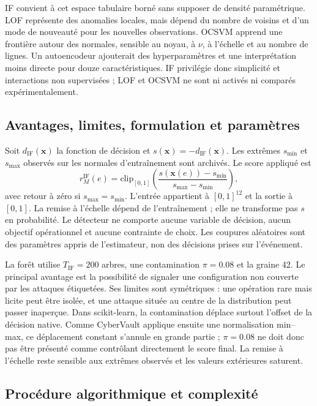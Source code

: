 \documentclass[11pt,a4paper,oneside]{report}
\theoremstyle{definition}
\theoremstyle{plain}
\begin{document}
IF convient à cet espace tabulaire borné sans supposer de densité paramétrique. LOF représente des anomalies locales, mais dépend du nombre de voisins et d'un mode de nouveauté pour les nouvelles observations. OCSVM apprend une frontière autour des normales, sensible au noyau, à $\nu$, à l'échelle et au nombre de lignes. Un autoencodeur ajouterait des hyperparamètres et une interprétation moins directe pour douze caractéristiques. IF privilégie donc simplicité et interactions non supervisées ; LOF et OCSVM ne sont ni activés ni comparés expérimentalement.

\subsection*{Avantages, limites, formulation et paramètres}

Soit $d_{\mathrm{IF}}(\mathbf{x})$ la fonction de décision et
$s(\mathbf{x})=-d_{\mathrm{IF}}(\mathbf{x})$. Les extrêmes $s_{\min}$ et
$s_{\max}$ observés sur les normales d'entraînement sont archivés. Le score appliqué est
\begin{equation}
r_M^{\mathrm{IF}}(e)=
\mathrm{clip}_{[0,1]}
\left(\frac{s(\mathbf{x}(e))-s_{\min}}{s_{\max}-s_{\min}}\right),
\label{eq:ai-ro-if}
\end{equation}
avec retour à zéro si $s_{\max}=s_{\min}$. L'entrée appartient à $[0,1]^{12}$ et la sortie à $[0,1]$. La remise à l'échelle dépend de l'entraînement ; elle ne transforme pas $s$ en probabilité. Le détecteur ne comporte aucune variable de décision, aucun objectif opérationnel et aucune contrainte de choix. Les coupures aléatoires sont des paramètres appris de l'estimateur, non des décisions prises sur l'événement.

La forêt utilise $T_{\mathrm{IF}}=200$ arbres, une contamination $\pi=0.08$ et la graine 42. Le principal avantage est la possibilité de signaler une configuration non couverte par les attaques étiquetées. Ses limites sont symétriques : une opération rare mais licite peut être isolée, et une attaque située au centre de la distribution peut passer inaperçue. Dans scikit-learn, la contamination déplace surtout l'offset de la décision native. Comme CyberVault applique ensuite une normalisation min--max, ce déplacement constant s'annule en grande partie ; $\pi=0.08$ ne doit donc pas être présenté comme contrôlant directement le score final. La remise à l'échelle reste sensible aux extrêmes observés et les valeurs extérieures saturent.

\subsection*{Procédure algorithmique et complexité}
\end{document}
